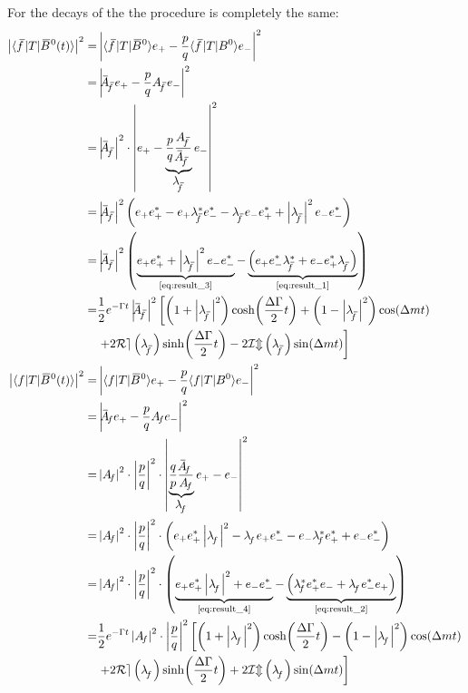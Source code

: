 For the decays of the \Bzb the procedure is completely the same:
\begin{align}
  \left|\bra{\fbar} T \ket{\Bzb(t)}\right|^2
  =& \left| \bra{\fbar} T \ket{\Bzb} e_+ - \frac{p}{q} \bra{\fbar} T \ket{\Bz}e_-\right|^2\nonumber\\
  =&\left|\Abarfbar e_+ - \frac{p}{q}\Afbar e_-\right|^2\nonumber\\
  =&\left|\Abarfbar \right|^2 \cdot
  \left| e_+ - \underbrace{\frac{p}{q}\frac{\Afbar }{\Abarfbar }}_{\Lfbar } e_- \right|^2\nonumber\\
  =&\left|\Abarfbar \right|^2
  \left( e_+e_+^* - e_+\Lfbarst e_-^*-\Lfbar  e_-e_+^*+\left|\Lfbar \right|^2e_-e_-^*\right)\nonumber\\
  =&\left|\Abarfbar \right|^2\left(\underbrace{e_+e_+^* + \left|\Lfbar \right|^2e_-e_-^*}_{\text{\cref{eq:result_3}}}
  -\underbrace{\left(e_+e_-^*\Lfbarst  + e_-e_+^*\Lfbar  \right)}_{\text{\cref{eq:result_1}}}\right)\nonumber\\
  =&\frac{1}{2}e^{-\Gamma t}\left|\Abarfbar \right|^2\left[\left(1+\left|\Lfbar \right|^2\right)
  \cosh\!\left(\frac{\Delta\Gamma}{2}t\right)+\left(1-\left|\Lfbar \right|^2\right)\cos\!\left(\Delta mt\right)\right.\nonumber\\
  &\left.+2\mathcal{Re}\left(\Lfbar \right)\sinh\!\left(\frac{\Delta\Gamma}{2}t\right)-2\mathcal{Im}\left(\Lfbar \right)
  \sin\!\left(\Delta mt\right)\right]\\
  \left|\bra{f} T \ket{\Bzb(t)}\right|^2
  =& \left| \bra{f} T \ket{\Bzb} e_+ - \frac{p}{q} \bra{f} T \ket{\Bz}e_-\right|^2\nonumber\\
  =&\left|\Abarf  e_+ - \frac{p}{q} \Af e_-\right|^2\nonumber\\
  =&\left| \Af \right|^2 \cdot \left| \frac{p}{q} \right|^2 \cdot
  \left| \underbrace{\frac{q}{p}\frac{ \Abarf  }{ \Af }}_{\Lf} e_+ - e_-\right|^2\nonumber\\
  =& \left| \Af \right|^2 \cdot \left| \frac{p}{q} \right|^2\cdot\left( e_+e_+^*\left|\Lf\right|^2 -\Lf e_+e_-^*
  - e_-\Lfst e_+^* + e_-e_-^*\right)\nonumber\\
  =& \left| \Af \right|^2 \cdot \left| \frac{p}{q} \right|^2\cdot\left(\underbrace{e_+e_+^*\left|\Lf\right|^2 + e_-e_-^*}_{\text{\cref{eq:result_4}}}
  -\underbrace{\left(\Lfst e_+^*e_- + \Lf e_-^*e_+\right)}_{\text{\cref{eq:result_2}}}\right)\nonumber\\
  =&\frac{1}{2}e^{-\Gamma t}\left| \Af \right|^2 \cdot \left| \frac{p}{q} \right|^2\left[\left(1+\left|\Lf\right|^2\right)
  \cosh\!\left(\frac{\Delta\Gamma}{2}t\right)-\left(1-\left|\Lf\right|^2\right)\cos\!\left(\Delta mt\right)\right.\nonumber\\
  &\left.+2\mathcal{Re}\left(\Lf\right)\sinh\!\left(\frac{\Delta\Gamma}{2}t\right)
  +2\mathcal{Im}\left(\Lf\right)\sin\!\left(\Delta mt\right)\right]
\end{align}
